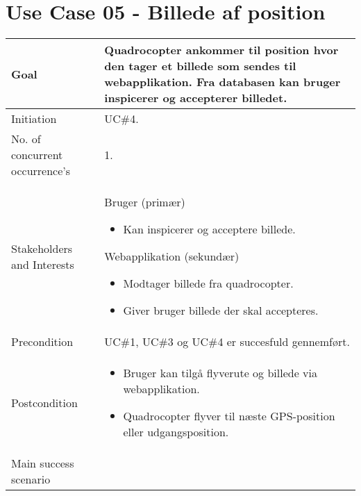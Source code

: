 \section{Use Case 05 - Billede af position}

\begin{table}[H]
\begin{tabular}{|l|p{10cm}|}
\hline

Goal	 								& Quadrocopter ankommer til position hvor den tager et billede som sendes til
webapplikation. Fra databasen kan bruger inspicerer og accepterer billedet. \\\hline
Initiation 							& UC\#4. \\\hline
No. of concurrent occurrence’s		& 1. \\\hline
Stakeholders	and Interests			& Bruger (primær) 
										\begin{itemize}
											\item Kan inspicerer og acceptere billede.
										\end{itemize} 
									  Webapplikation (sekundær)
										\begin{itemize}
											\item Modtager billede fra quadrocopter.
											\item Giver bruger billede der skal accepteres.
										\end{itemize} \\\hline
Precondition							& UC\#1, UC\#3 og UC\#4 er succesfuld gennemført. \\\hline
Postcondition						& 	\begin{itemize}
											\item Bruger kan tilgå flyverute og billede via webapplikation.
											\item Quadrocopter flyver til næste GPS-position eller udgangsposition.
										\end{itemize} \\\hline
Main success scenario				&
 
									\renewcommand{\labelenumi}{\arabic{enumi}.}
									\renewcommand{\labelenumii}{\Roman{enumii}:}


\end{tabular}
\end{table}
